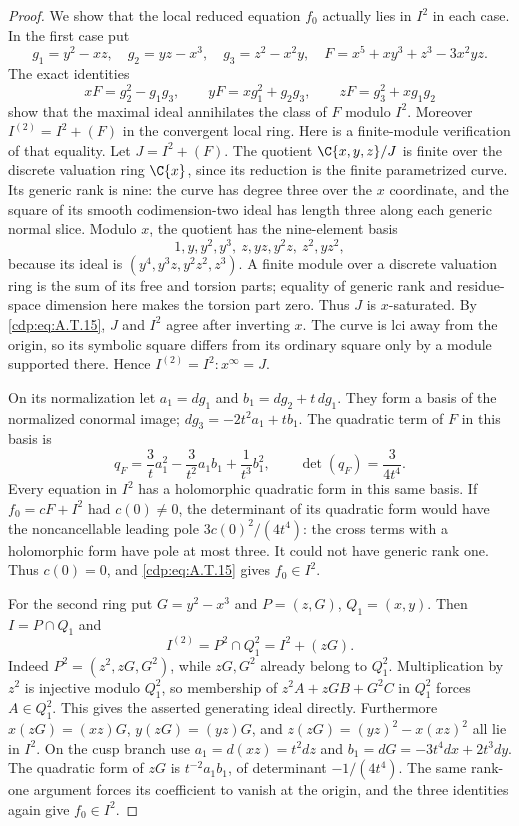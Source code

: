 \begin{proof}
We show that the local reduced equation $f_0$ actually
lies in $I^2$ in each case. In the first case put
\[
 g_1=y^2-xz,\quad g_2=yz-x^3,\quad
 g_3=z^2-x^2y,\quad
 F=x^5+xy^3+z^3-3x^2yz.
\]
The exact identities
\[
 xF=g_2^2-g_1g_3,\qquad
 yF=xg_1^2+g_2g_3,\qquad
 zF=g_3^2+xg_1g_2                              \tag{A.T.15}\label{cdp:eq:A.T.15}
\]
show that the maximal ideal annihilates the class of
$F$ modulo $I^2$. Moreover
$I^{(2)}=I^2+(F)$ in the convergent local ring.
Here is a finite-module verification of that equality.
Let $J=I^2+(F)$. The quotient $\C\{x,y,z\}/J$ is
finite over the discrete valuation ring $\C\{x\}$,
since its reduction is the finite parametrized curve.
Its generic rank is nine: the curve has degree three
over the $x$ coordinate, and the square of its smooth
codimension-two ideal has length three along each
generic normal slice. Modulo $x$, the quotient has
the nine-element basis
\[
 1,y,y^2,y^3,\ z,yz,y^2z,\ z^2,yz^2,
\]
because its ideal is $(y^4,y^3z,y^2z^2,z^3)$.
A finite module over a discrete valuation ring is
the sum of its free and torsion parts; equality of
generic rank and residue-space dimension here makes
the torsion part zero. Thus $J$ is $x$-saturated.
By \eqref{cdp:eq:A.T.15}, $J$ and $I^2$ agree after inverting $x$.
The curve is lci away from the origin, so its symbolic
square differs from its ordinary square only by a
module supported there. Hence
$I^{(2)}=I^2:x^\infty=J$.

On its normalization let
$a_1=dg_1$ and $b_1=dg_2+t\,dg_1$.
They form a basis of the normalized conormal image;
$dg_3=-2t^2a_1+t b_1$.
The quadratic term of $F$ in this basis is
\[
 q_F=\frac3t a_1^2-\frac3{t^2}a_1b_1
                           +\frac1{t^3}b_1^2,
 \qquad \det(q_F)=\frac3{4t^4}.                  \tag{A.T.16}\label{cdp:eq:A.T.16}
\]
Every equation in $I^2$ has a holomorphic quadratic
form in this same basis. If $f_0=cF+I^2$ had
$c(0)\ne0$, the determinant of its quadratic form
would have the noncancellable leading pole
$3c(0)^2/(4t^4)$: the cross terms with a holomorphic
form have pole at most three. It could not have
generic rank one. Thus $c(0)=0$, and \eqref{cdp:eq:A.T.15} gives
$f_0\in I^2$.

For the second ring put $G=y^2-x^3$ and
$P=(z,G)$, $Q_1=(x,y)$. Then $I=P\cap Q_1$ and
\[
 I^{(2)}=P^2\cap Q_1^2=I^2+(zG).                \tag{A.T.17}\label{cdp:eq:A.T.17}
\]
Indeed $P^2=(z^2,zG,G^2)$, while $zG,G^2$ already
belong to $Q_1^2$. Multiplication by $z^2$ is
injective modulo $Q_1^2$, so membership of
$z^2A+zGB+G^2C$ in $Q_1^2$ forces $A\in Q_1^2$.
This gives the asserted generating ideal directly.
Furthermore
$x(zG)=(xz)G$, $y(zG)=(yz)G$, and
$z(zG)=(yz)^2-x(xz)^2$ all lie in $I^2$.
On the cusp branch use $a_1=d(xz)=t^2dz$ and
$b_1=dG=-3t^4dx+2t^3dy$.
The quadratic form of $zG$ is $t^{-2}a_1b_1$,
of determinant $-1/(4t^4)$. The same rank-one
argument forces its coefficient to vanish at the
origin, and the three identities again give
$f_0\in I^2$.


\end{proof}
